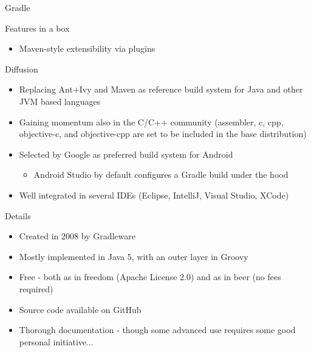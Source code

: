 \documentclass[presentation]{beamer}
\begin{document}
\begin{frame}{Gradle}
\begin{block}{Features in a box}
\begin{itemize}
			\item Maven-style extensibility via plugins
		\end{itemize}
	\end{block}
	\begin{block}{Diffusion}
		\begin{itemize}
			\item Replacing Ant+Ivy and Maven as reference build system for Java and other JVM based languages
			\item Gaining momentum also in the C/C++ community (assembler, c, cpp, objective-c, and objective-cpp are set to be included in the base distribution)
			\item Selected by Google as preferred build system for Android
			\begin{itemize}
				\item Android Studio by default configures a Gradle build under the hood
			\end{itemize}
			\item Well integrated in several IDEs (Eclipse, IntelliJ, Visual Studio, XCode)
		\end{itemize}
	\end{block}
	\begin{block}{Details}
		\begin{itemize}
			\item Created in 2008 by Gradleware
			\item Mostly implemented in Java 5, with an outer layer in Groovy
			\item Free - both as in freedom (Apache License 2.0) and as in beer (no fees required)
			\item Source code available on GitHub
			\item Thorough documentation - though some advanced use requires some good personal initiative...
		\end{itemize}
	\end{block}
\end{frame}
\end{document}
